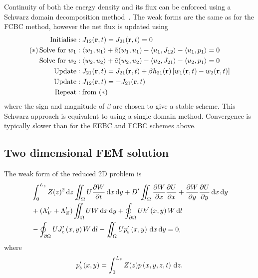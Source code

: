 \documentclass[a4paper]{article}
\numberwithin{equation}{section}
\begin{document}
Continuity of both the energy density and its flux can be enforced using a Schwarz domain decomposition
method~\citep{Lions1990}. The weak forms are the same as for the FCBC method, however the net flux is updated using
\begin{align}
\mathrm{Initialise} &: J_{12}(\boldsymbol{\mathrm{r}},t) = J_{21}(\boldsymbol{\mathrm{r}},t) = 0 \nonumber \\
\mathrm{(\ast)\,Solve\,\,for}\,\,w_1 &: \langle w_1,u_1 \rangle + \tilde{a}(w_1,u_1) - \langle u_1 , J_{12} \rangle - \langle u_1 , p_1 \rangle = 0 \nonumber \\
\mathrm{Solve\,\,for}\,\,w_2 &: \langle w_2,u_2 \rangle + \tilde{a}(w_2,u_2) - \langle u_2 , J_{21} \rangle - \langle u_2 , p_1 \rangle = 0 \nonumber \\
\mathrm{Update} &: J_{21}(\boldsymbol{\mathrm{r}},t) = J_{21}(\boldsymbol{\mathrm{r}},t) + \beta h_{21}(\boldsymbol{\mathrm{r}}) \left[ w_1(\boldsymbol{\mathrm{r}},t) - w_2(\boldsymbol{\mathrm{r}},t) \right] \nonumber \\
\mathrm{Update} &: J_{12}(\boldsymbol{\mathrm{r}},t) = -J_{21}(\boldsymbol{\mathrm{r}},t) \nonumber \\
\mathrm{Repeat} &: \mathrm{from}\,\,(\ast) \nonumber
\end{align}
where the sign and magnitude of $\beta$ are chosen to give a stable scheme. This Schwarz approach
is equivalent to using a single domain method. Convergence is typically slower than for the 
EEBC and FCBC schemes above.

\subsection[Two dimensional FEM solution]{Two dimensional FEM solution}
\label{sc:fem:2d}

The weak form of the reduced 2D problem is
\begin{align}
&\int_0^{L_z}Z(z)^2\,\mathrm{d}{z}\iint_{\Omega} U\frac{{\partial}W}{{\partial}t}\,\mathrm{d}{x}\,\mathrm{d}{y}
+D^\prime\iint_{\Omega}\frac{{\partial}W}{{\partial}x}\frac{{\partial}U}{{\partial}x}+\frac{{\partial}W}{{\partial}y}\frac{{\partial}U}{{\partial}y}\,\mathrm{d}{x}\,\mathrm{d}{y} \nonumber \\
&+\left(\Lambda_V^\prime+\Lambda_Z^\prime\right)\iint_{\Omega }UW\,\mathrm{d}{x}\,\mathrm{d}{y}
+\oint_{\partial\Omega} Uh^\prime\left(x,y\right)W\,\mathrm{d}{l} \nonumber \\
&-\oint_{\partial\Omega} UJ_{\mathrm{c}}^\prime\left(x,y\right) W\,\mathrm{d}{l}
-\iint_{\Omega} U p_{\mathrm{s}}^\prime\left(x,y\right)\,\mathrm{d}{x}\,\mathrm{d}{y}=0,
\end{align}
where
\begin{align}
p_{\mathrm{s}}^\prime\left(x,y\right)=\int_0^{L_z}Z(z)p\left(x,y,z,t\right)\,\mathrm{d}{z}.
\end{align}
\end{document}

